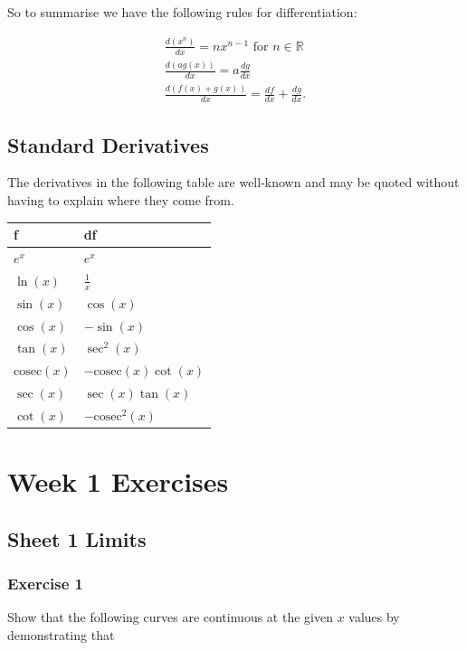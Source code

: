 \documentclass[
  11pt,
  oneside]{book}
\newcommand{\slide}{}
\theoremstyle{definition}
\theoremstyle{definition}
\theoremstyle{definition}
\theoremstyle{definition}
\theoremstyle{remark}
\begin{document}
So to summarise we have the following rules for differentiation:

\begin{gather}
\frac{d(x^n)}{dx} = nx^{n-1}\text{ for }n\in{\mathbb R}\\
\frac{d(ag(x))}{dx} = a\frac{dg}{dx}\\
\frac{d(f(x)+g(x))}{dx} = \frac{df}{dx}+\frac{dg}{dx}.
\end{gather}
\slide

\section{Standard Derivatives}\label{standard-derivatives}

The derivatives in the following table are well-known and may be quoted without having to explain where they come from.

\begin{tabular}{l|l}
\hline
f & df\\
\hline
$e^x$ & $e^x$\\
\hline
$\ln(x)$ & $\frac{1}{x}$\\
\hline
$\sin(x)$ & $\cos(x)$\\
\hline
$\cos(x)$ & $-\sin(x)$\\
\hline
$\tan(x)$ & $\sec^2(x)$\\
\hline
$\text{cosec}(x)$ & $-\text{cosec}(x)\cot(x)$\\
\hline
$\sec(x)$ & $\sec(x)\tan(x)$\\
\hline
$\cot(x)$ & $-\text{cosec}^2(x)$\\
\hline
\end{tabular}

\chapter*{Week 1 Exercises}\label{week-1-exercises}

\section{Sheet 1 Limits}\label{sheet-1-limits}

\subsection*{Exercise 1}\label{exercise-1}

Show that the following curves are continuous at the given \(x\) values by demonstrating that
\end{document}
